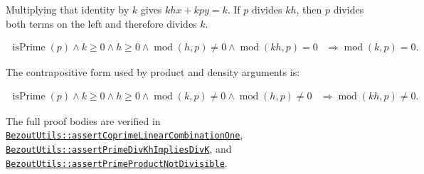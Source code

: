 Multiplying that identity by $k$ gives $k h x + k p y = k$. If $p$ divides
$k h$, then $p$ divides both terms on the left and therefore divides $k$.

\begin{equation*}
\begin{aligned}
\operatorname{isPrime}(p)
\land k\ge0
\land h\ge0
\land \operatorname{mod}(h,p)\ne0
\land \operatorname{mod}(kh,p)=0
&\Rightarrow \operatorname{mod}(k,p)=0.
\end{aligned}
\end{equation*}

The contrapositive form used by product and density arguments is:

\begin{equation*}
\begin{aligned}
\operatorname{isPrime}(p)
\land k\ge0
\land h\ge0
\land \operatorname{mod}(k,p)\ne0
\land \operatorname{mod}(h,p)\ne0
&\Rightarrow \operatorname{mod}(kh,p)\ne0.
\end{aligned}
\end{equation*}

{\raggedright
The full proof bodies are verified in
\href{https://github.com/thiagomata/prime-numbers/blob/euclid-theorem-article-v1.0.0/src/main/scala/v1/chapter5/prime/BezoutUtils.scala}{\texttt{BezoutUtils::assertCoprimeLinearCombinationOne}},
\href{https://github.com/thiagomata/prime-numbers/blob/euclid-theorem-article-v1.0.0/src/main/scala/v1/chapter5/prime/BezoutUtils.scala}{\texttt{BezoutUtils::assertPrimeDivKhImpliesDivK}},
and
\href{https://github.com/thiagomata/prime-numbers/blob/euclid-theorem-article-v1.0.0/src/main/scala/v1/chapter5/prime/BezoutUtils.scala}{\texttt{BezoutUtils::assertPrimeProductNotDivisible}}.
\par}
